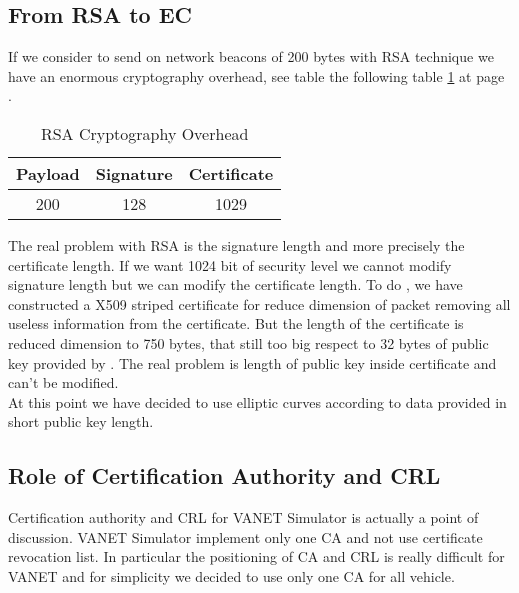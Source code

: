\subsection{From RSA to EC}
If we consider to send on network beacons of 200 bytes with RSA technique we have an enormous cryptography overhead, see table the following table \ref{tab:RSAOverHead} at page \pageref{tab:RSAOverHead}.
\begin{table}[!ht]
	\centering
	\caption{RSA Cryptography Overhead}
	\begin{tabular}{|c|c|c|}
	\hline\hline 
	\textbf{Payload} & \textbf{Signature} & \textbf{Certificate}\\
	\hline
	200 & 128 & 1029 \\
	\hline
	\hline     %
 	\end{tabular} 
	\label{tab:RSAOverHead}
\end{table}
The real problem with RSA is the signature length and more precisely the  certificate length. If we want 1024 bit of security level we cannot modify signature length but we can modify the  certificate length. To do , we have constructed a X509 striped certificate for reduce dimension of packet removing all useless  information from the  certificate. But the length of the certificate is reduced dimension to 750 bytes, that still too big respect to 32 bytes of public key  provided by \cite{calandriello}. The real problem is length of public key inside certificate and can't be modified.\\
At this point we have decided to use elliptic curves according to data  provided in \cite{calandriello} short public key length.
\subsection{Role of Certification Authority and CRL}
Certification authority and CRL for VANET Simulator is actually a point of discussion\cite{calandriello}. VANET Simulator implement only one CA and not use certificate revocation list. In particular the positioning of CA and CRL is really difficult for VANET and for simplicity we decided to  use only one CA for all vehicle.
